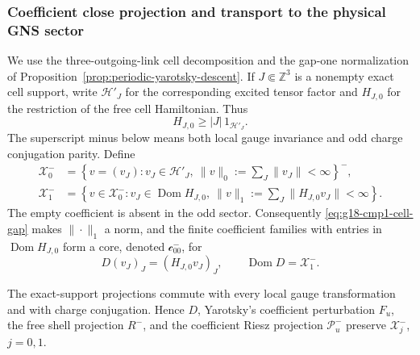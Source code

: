 
\subsubsection{Coefficient close projection and transport to the physical GNS sector}
\label{sec:g18-cmp1-complete}

We use the three-outgoing-link cell decomposition and the gap-one
normalization of Proposition~\ref{prop:periodic-yarotsky-descent}.  If
$J\Subset\mathbb Z^3$ is a nonempty exact cell support, write
$\mathcal H'_J$ for the corresponding excited tensor factor and
$H_{J,0}$ for the restriction of the free cell Hamiltonian.  Thus
\begin{equation}
 H_{J,0}\ge |J|\,1_{\mathcal H'_J}.
 \label{eq:g18-cmp1-cell-gap}
\end{equation}
The superscript minus below means both local gauge invariance and odd charge
conjugation parity.  Define
\begin{align}
 \mathcal X_0^-&=
 \left\{v=(v_J):v_J\in\mathcal H'_J,
       \ \|v\|_0:=\sum_J\|v_J\|<\infty\right\}^-,
 \label{eq:g18-cmp1-x0}\\
 \mathcal X_1^-&=
 \left\{v\in\mathcal X_0^-:v_J\in\operatorname{Dom}H_{J,0},
       \ \|v\|_1:=\sum_J\|H_{J,0}v_J\|<\infty\right\}.
 \label{eq:g18-cmp1-x1}
\end{align}
The empty coefficient is absent in the odd sector.  Consequently
\eqref{eq:g18-cmp1-cell-gap} makes $\|\cdot\|_1$ a norm, and the finite
coefficient families with entries in $\operatorname{Dom}H_{J,0}$ form a
core, denoted $\mathcal c_{00}^-$, for
\begin{equation}
 D(v_J)_J=(H_{J,0}v_J)_J,
 \qquad \operatorname{Dom}D=\mathcal X_1^-.
 \label{eq:g18-cmp1-D}
\end{equation}

\begin{lemma}
\label{lem:g18-cmp1-exact-support-symmetry}
The exact-support projections commute with every local gauge
transformation and with charge conjugation.  Hence $D$, Yarotsky's
coefficient perturbation $F_u$, the free shell projection $R^-$, and the
coefficient Riesz projection $\mathcal P_u^-$ preserve
$\mathcal X_j^-$, $j=0,1$.
\end{lemma}

